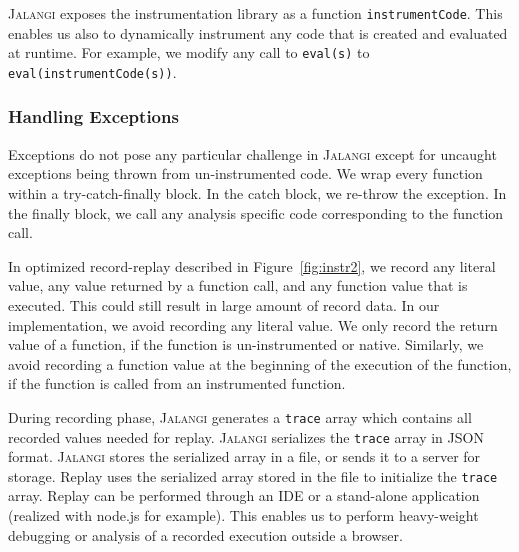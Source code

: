 \documentclass{sig-alternate}
\def\jalangi{\textsc{Jalangi}}
\begin{document}
\jalangi{} exposes the instrumentation
library as a function \texttt{instrumentCode}.  This enables us also
to dynamically instrument any code that is created and evaluated at
runtime.  For example, we modify any call to \texttt{eval(s)} to
\texttt{eval(instrumentCode(s))}.

\subsubsection*{Handling Exceptions}
\label{sec:handling-exceptions}

Exceptions do not pose any particular challenge in \jalangi{} except
for uncaught exceptions being thrown from un-instrumented code.  We
wrap every function within a try-catch-finally block.  In the catch
block, we re-throw the exception.  In the finally block, we call any
analysis specific code corresponding to the function call.


In optimized record-replay described in Figure~\ref{fig:instr2}, we
record any literal value, any value returned by a function call, and
any function value that is executed.  This could still result in large
amount of record data.  In our implementation, we avoid recording any
literal value.  We only record the return value of a function, if the
function is un-instrumented or native.  Similarly, we avoid recording
a function value at the beginning of the execution of the function, if
the function is called from an instrumented function.

During recording phase, \jalangi{} generates a \texttt{trace} array
which contains all recorded values needed for replay.  \jalangi{}
serializes the \texttt{trace} array in JSON format.  \jalangi{} stores
the serialized array in a file, or sends it to a server for storage.
Replay uses the serialized array stored in the file to initialize the
\texttt{trace} array. Replay can be performed through an IDE or a
stand-alone application (realized with node.js for example). This
enables us to perform heavy-weight debugging or analysis of a recorded
execution outside a browser.
\end{document}
